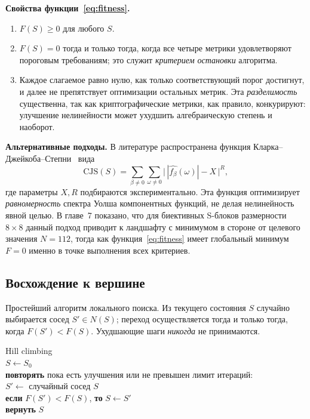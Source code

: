\textbf{Свойства функции~\eqref{eq:fitness}.}
\begin{enumerate}
    \item $F(S) \geq 0$ для любого $S$.
    \item $F(S) = 0$ тогда и только тогда, когда все четыре метрики
        удовлетворяют пороговым требованиям; это служит \emph{критерием
        остановки} алгоритма.
    \item Каждое слагаемое равно нулю, как только соответствующий
        порог достигнут, и далее не препятствует оптимизации
        остальных метрик. Эта \emph{разделимость} существенна, так как
        криптографические метрики, как правило, конкурируют:
        улучшение нелинейности может ухудшить алгебраическую степень
        и наоборот.
\end{enumerate}

\textbf{Альтернативные подходы.} В литературе распространена
функция Кларка–Джейкоба–Степни~\cite{clark2005sboxes} вида
\[
    \mathrm{CJS}(S) = \sum_{\beta \neq 0} \sum_{\omega \neq 0} \bigl|\,|\widehat{f_\beta}(\omega)| - X\,\bigr|^R,
\]
где параметры $X, R$ подбираются экспериментально. Эта функция
оптимизирует \emph{равномерность} спектра Уолша компонентных функций,
не делая нелинейность явной целью. В главе~7 показано, что для
биективных S-блоков размерности $8 \times 8$ данный подход приводит
к ландшафту с минимумом в стороне от целевого значения $N = 112$,
тогда как функция~\eqref{eq:fitness} имеет глобальный минимум
$F = 0$ именно в точке выполнения всех критериев.

\subsection{Восхождение к вершине}

Простейший алгоритм локального поиска. Из текущего состояния $S$
случайно выбирается сосед $S' \in N(S)$; переход осуществляется
тогда и только тогда, когда $F(S') < F(S)$. Ухудшающие шаги
\emph{никогда} не принимаются.

\begin{algorithm}{Hill climbing}\hfill\\
$S \leftarrow S_0$ \\
\textbf{повторять} пока есть улучшения или не превышен лимит итераций: \\
\quad $S' \leftarrow$ случайный сосед $S$ \\
\quad \textbf{если} $F(S') < F(S)$, \textbf{то} $S \leftarrow S'$ \\
\textbf{вернуть} $S$
\end{algorithm}

